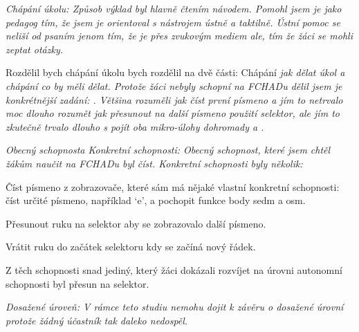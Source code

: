 \em Chápání úkolu\em : Způsob výklad byl hlavně čtením návodem.  Pomohl jsem je jako pedagog tím, že jsem je orientoval s nástrojem ústně a taktilně.  Ústní pomoc se neliší od psaním jenom tím, že je přes zvukovým mediem ale, tím že žáci se mohli zeptat otázky.

Rozdělil bych chápání úkolu bych rozdělil na dvě části: Chápání \em jak \em dělat úkol a chápání co by měli dělat.  Protože žáci nebyly schopní  na FCHADu dělil jsem je konkrétnější zadání: .  Většina rozuměli \em jak \em číst první písmeno a jím to netrvalo moc dlouho rozumět jak přesunout na další písmeno použití selektor, ale jím to zkutečně trvalo dlouho s pojít oba mikro-úlohy dohromady a .

\em Obecný schopnost\em a \em Konkretní schopnosti\em :  Obecný schopnost, které jsem chtěl žákům naučit na FCHADu byl číst.  Konkretní schopnosti byly několik:

Číst písmeno z zobrazovače, které sám má nějaké vlastní konkretní schopnosti: číst určité písmeno, například `e', a pochopit funkce body sedm a osm.

Přesunout ruku na selektor aby se zobrazovalo další písmeno.

Vrátit ruku do začátek selektoru kdy se začíná nový řádek.

Z těch schopnosti snad jediný, který žáci dokázali rozvíjet na úrovni autonomní schopnosti byl přesun na selektor.

\em Dosažené úroveň\em : V rámce teto studiu nemohu dojit k závěru o dosažené úrovní protože žádný účastník tak daleko nedospěl.
